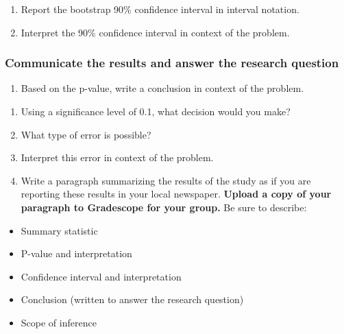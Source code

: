 \documentclass[
]{report}
\providecommand{\tightlist}{%
  \setlength{\itemsep}{0pt}\setlength{\parskip}{0pt}}
\begin{document}
\begin{enumerate}
\def\labelenumi{\arabic{enumi}.}
\setcounter{enumi}{9}
\item
  Report the bootstrap 90\% confidence interval in interval notation.\\
  \vspace{0.5in}
\item
  Interpret the 90\% confidence interval in context of the problem.
  \vspace{0.8in}
\end{enumerate}

\hypertarget{communicate-the-results-and-answer-the-research-question-6}{%
\subsubsection*{Communicate the results and answer the research question}\label{communicate-the-results-and-answer-the-research-question-6}}

\begin{enumerate}
\def\labelenumi{\arabic{enumi}.}
\setcounter{enumi}{11}
\tightlist
\item
  Based on the p-value, write a conclusion in context of the problem.
\end{enumerate}

\vspace{.8in}

\begin{enumerate}
\def\labelenumi{\arabic{enumi}.}
\setcounter{enumi}{12}
\item
  Using a significance level of 0.1, what decision would you make?
  \vspace{0.2in}
\item
  What type of error is possible?
  \vspace{0.3in}
\item
  Interpret this error in context of the problem.
  \vspace{0.8in}
\item
  Write a paragraph summarizing the results of the study as if you are reporting these results in your local newspaper. \textbf{Upload a copy of your paragraph to Gradescope for your group.} Be sure to describe:
\end{enumerate}

\begin{itemize}
\item
  Summary statistic
\item
  P-value and interpretation
\item
  Confidence interval and interpretation
\item
  Conclusion (written to answer the research question)
\item
  Scope of inference
\end{itemize}
\end{document}
